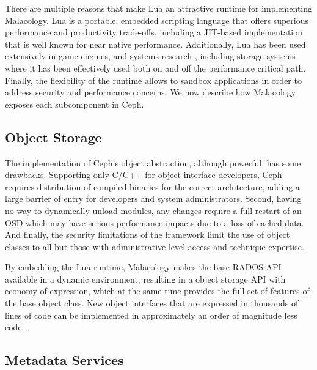 \documentclass[10pt,twocolumn]{article}
\begin{document}
There are multiple reasons that make Lua an attractive runtime for implementing 
Malacology. Lua is a portable, embedded
scripting language that offers superious performance and productivity
trade-offs, including a JIT-based implementation that is well known for near
native performance. Additionally, Lua has been used extensively in game engines, 
and systems research \cite{neto:dls14-luaos}, including storage systems where it 
has been effectively used both on
\cite{grawinkel:pdsw2012-lua,watkins2013:bdmc13-in-vivo,geambasu_comet_2010} and 
off
\cite{sevilla:sc15-mantle} the performance critical path. Finally, the 
flexibility of the runtime allows to sandbox applications in order to address 
security and performance concerns. We now describe how Malacology exposes each 
subcomponent in Ceph.

\subsection{Object Storage}

%

The implementation of Ceph's object abstraction, although powerful, has some 
drawbacks.
Supporting only C/C++ for object interface developers, Ceph requires
distribution of compiled binaries for the correct architecture, adding a
large barrier of entry for developers and system administrators. Second,
having no way to dynamically unload modules, any changes require a full
restart of an OSD which may have serious performance impacts due to a loss
of cached data. And finally, the security limitations of the framework
limit the use of object classes to all but those with administrative level
access and technique expertise.

By embedding the Lua runtime, Malacology makes the base RADOS API available in a 
dynamic environment, resulting in a object storage API with economy of 
expression, which at the same time provides the full set of features of the base 
object class. New object interfaces that are expressed in thousands of lines of 
code can be implemented in approximately an order of magnitude less 
code~\cite{geambasu_comet_2010}.


\subsection{Metadata Services}
\end{document}
